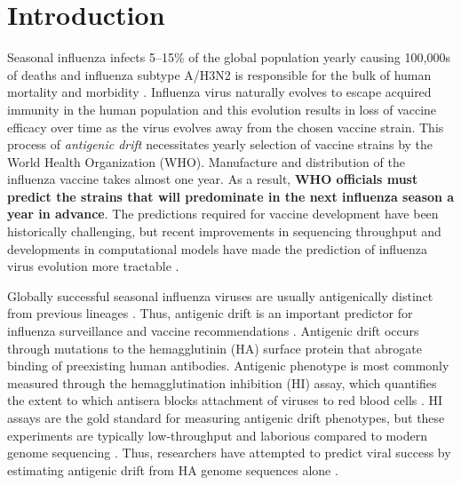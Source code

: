 \chapter {Introduction}

Seasonal influenza infects 5--15\% of the global population yearly causing 100,000s of deaths and influenza subtype A/H3N2 is responsible for the bulk of human mortality and morbidity \cite{WHO2009}.
Influenza virus naturally evolves to escape acquired immunity in the human population and this evolution results in loss of vaccine efficacy over time as the virus evolves away from the chosen vaccine strain.
This process of \textit{antigenic drift} necessitates yearly selection of vaccine strains by the World Health Organization (WHO).
Manufacture and distribution of the influenza vaccine takes almost one year.
As a result, \textbf{WHO officials must predict the strains that will predominate in the next influenza season a year in advance}.
The predictions required for vaccine development have been historically challenging, but recent improvements in sequencing throughput and developments in computational models have made the prediction of influenza virus evolution more tractable \cite{Lassig:2017hr,Morris:2017ea}.

Globally successful seasonal influenza viruses are usually antigenically distinct from previous lineages \cite{Smith:2004jc}.
Thus, antigenic drift is an important predictor for influenza surveillance and vaccine recommendations \cite{Morris:2017ea}.
Antigenic drift occurs through mutations to the hemagglutinin (HA) surface protein that abrogate binding of preexisting human antibodies.
Antigenic phenotype is most commonly measured through the hemagglutination inhibition (HI) assay, which quantifies the extent to which antisera blocks attachment of viruses to red blood cells \cite{hirst1943studies}.
HI assays are the gold standard for measuring antigenic drift phenotypes, but these experiments are typically low-throughput and laborious compared to modern genome sequencing \cite{Wood:2012ii}.
Thus, researchers have attempted to predict viral success by estimating antigenic drift from HA genome sequences alone \cite{Luksza:2014hj,Steinbruck:2014kq,Neher:2014eu}.

